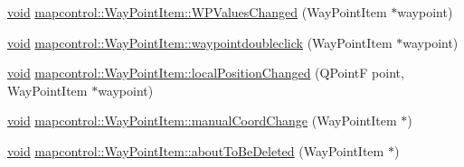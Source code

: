 \begin{DoxyCompactItemize}
\hyperlink{group___u_a_v_objects_plugin_ga444cf2ff3f0ecbe028adce838d373f5c}{void} \hyperlink{group___o_p_map_widget_gac48456e8c6628a31dc82e235dbf94c2f}{mapcontrol\-::\-Way\-Point\-Item\-::\-W\-P\-Values\-Changed} (\-Way\-Point\-Item $\ast$waypoint)
\item 
\hyperlink{group___u_a_v_objects_plugin_ga444cf2ff3f0ecbe028adce838d373f5c}{void} \hyperlink{group___o_p_map_widget_ga94099ae67d892548f27f41b816f4735f}{mapcontrol\-::\-Way\-Point\-Item\-::waypointdoubleclick} (\-Way\-Point\-Item $\ast$waypoint)
\item 
\hyperlink{group___u_a_v_objects_plugin_ga444cf2ff3f0ecbe028adce838d373f5c}{void} \hyperlink{group___o_p_map_widget_gaa25d07c9de649428ed3dd38384048404}{mapcontrol\-::\-Way\-Point\-Item\-::local\-Position\-Changed} (\-Q\-Point\-F point, \-Way\-Point\-Item $\ast$waypoint)
\item 
\hyperlink{group___u_a_v_objects_plugin_ga444cf2ff3f0ecbe028adce838d373f5c}{void} \hyperlink{group___o_p_map_widget_ga976918f8397d48a08ae2af24e0ab219c}{mapcontrol\-::\-Way\-Point\-Item\-::manual\-Coord\-Change} (\-Way\-Point\-Item $\ast$)
\item 
\hyperlink{group___u_a_v_objects_plugin_ga444cf2ff3f0ecbe028adce838d373f5c}{void} \hyperlink{group___o_p_map_widget_ga7ab7e29d2f8728b8fb7e804f0f2a34ed}{mapcontrol\-::\-Way\-Point\-Item\-::about\-To\-Be\-Deleted} (\-Way\-Point\-Item $\ast$)
\end{DoxyCompactItemize}
